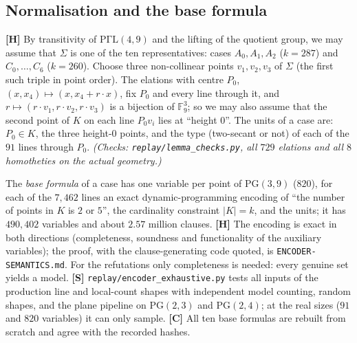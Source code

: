 \documentclass[11pt]{article}
\theoremstyle{plain}
\theoremstyle{remark}
\newcommand{\PG}{\mathrm{PG}}
\newcommand{\PGL}{\mathrm{P\Gamma L}}
\newcommand{\F}{\mathbb F}
\newcommand{\file}[1]{\texttt{#1}}
\begin{document}
\subsection{Normalisation and the base formula}
\textbf{[H]} By transitivity of $\PGL(4,9)$ and the lifting of the quotient group, we may assume that $\Sigma$ is one of the ten representatives: cases $A_0,A_1,A_2$ ($k=287$) and $C_0,\dots,C_6$ ($k=260$).
Choose three non-collinear points $v_1,v_2,v_3$ of $\Sigma$ (the first such triple in point order).
The elations with centre $P_0$, $(x,x_4)\mapsto(x,x_4+r\cdot x)$, fix $P_0$ and every line through it, and $r\mapsto(r\cdot v_1,r\cdot v_2,r\cdot v_3)$ is a bijection of $\F_9^3$; so we may also assume that the second point of $K$ on each line $P_0v_i$ lies at ``height $0$''.
The units of a case are: $P_0\in K$, the three height-$0$ points, and the type (two-secant or not) of each of the $91$ lines through $P_0$.
\emph{(Checks: \file{replay/lemma\_checks.py}, all $729$ elations and all $8$ homotheties on the actual geometry.)}

The \emph{base formula} of a case has one variable per point of $\PG(3,9)$ ($820$), for each of the $7{,}462$ lines an exact dynamic-programming encoding of ``the number of points in $K$ is $2$ or $5$'', the cardinality constraint $|K|=k$, and the units; it has $490{,}402$ variables and about $2.57$ million clauses.
\textbf{[H]} The encoding is exact in both directions (completeness, soundness and functionality of the auxiliary variables); the proof, with the clause-generating code quoted, is \file{ENCODER-SEMANTICS.md}.
For the refutations only completeness is needed: every genuine set yields a model.
\textbf{[S]} \file{replay/encoder\_exhaustive.py} tests all inputs of the production line and local-count shapes with independent model counting, random shapes, and the plane pipeline on $\PG(2,3)$ and $\PG(2,4)$; at the real sizes ($91$ and $820$ variables) it can only sample.
\textbf{[C]} All ten base formulas are rebuilt from scratch and agree with the recorded hashes.
\end{document}

